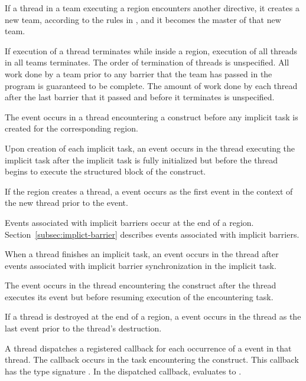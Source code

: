 If a thread in a team executing a  region encounters another 
directive, it creates a new team, according to the rules in
,
and it becomes the master of that new team.

If execution of a thread terminates while inside a  region, execution of all
threads in all teams terminates. The order of termination of threads is unspecified. All
work done by a team prior to any barrier that the team has passed in the program is
guaranteed to be complete. The amount of work done by each thread after the last
barrier that it passed and before it terminates is unspecified.

\events

The  event occurs in a thread encountering a
 construct before any implicit task is created for the
corresponding  region.

Upon creation of each implicit task, an  event
occurs in the thread executing the implicit task after the implicit
task is fully initialized but before the thread begins to execute the
structured block of the  construct.

If the  region creates a thread, a 
event occurs as the first event in the context of the new thread
prior to the
 event.

Events associated with implicit barriers occur at the end of a
 region. Section~\ref{subsec:implict-barrier} describes events
associated with implicit barriers.

When a thread finishes an implicit task, an 
event occurs in the thread after events associated with implicit
barrier synchronization in the implicit task.

The  event occurs in the thread encountering the
 construct after the thread
executes its  event
but before resuming execution of the encountering task.

If a thread is destroyed at the end of a  region, a
 event occurs in the thread as the last
event prior to the thread's destruction.

\tools

A thread dispatches a registered 
callback for each occurrence of a  event in that
thread.  The callback occurs in the task encountering
the  construct.  This callback has the type signature
.
In the dispatched callback, \linebreak {}
evaluates to .

